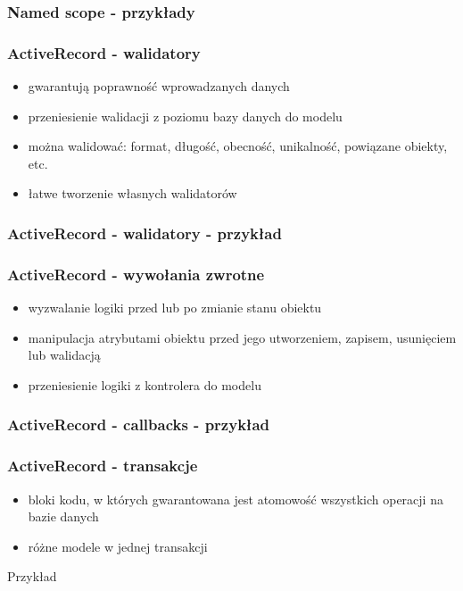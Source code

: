 \documentclass[12t]{beamer}
\begin{document}
\begin{frame}
  \frametitle{Named scope - przykłady}
  \begin{small}
    
  \end{small}
\end{frame}

\begin{frame}
  \frametitle{ActiveRecord - walidatory}
  \begin{itemize}
  \item gwarantują poprawność wprowadzanych danych
  \item przeniesienie walidacji z poziomu bazy danych do modelu
  \item można walidować: format, długość, obecność, unikalność,
    powiązane obiekty, etc.
  \item łatwe tworzenie własnych walidatorów
  \end{itemize}
\end{frame}

\begin{frame}
  \frametitle{ActiveRecord - walidatory - przykład}
  
\end{frame}

\begin{frame}
  \frametitle{ActiveRecord - wywołania zwrotne}
  \begin{itemize}
  \item wyzwalanie logiki przed lub po zmianie stanu obiektu
  \item manipulacja atrybutami obiektu przed jego utworzeniem,
    zapisem, usunięciem lub walidacją
  \item przeniesienie logiki z kontrolera do modelu
  \end{itemize}
\end{frame}

\begin{frame}
  \frametitle{ActiveRecord - callbacks - przykład}
  
\end{frame}

\begin{frame}
  \frametitle{ActiveRecord - transakcje}
  \begin{itemize}
  \item bloki kodu, w których gwarantowana jest atomowość wszystkich
    operacji na bazie danych
  \item różne modele w jednej transakcji
  \end{itemize}
  \begin{block}{Przykład}
    
  \end{block}
\end{frame}
\end{document}
